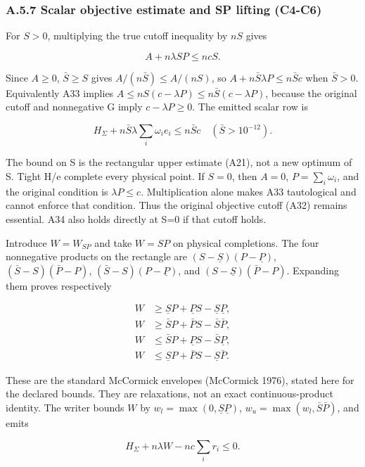\documentclass[
  american,
  11pt,
]{article}
\begin{document}
\subsubsection{A.5.7 Scalar objective estimate and SP lifting
(C4-C6)}\label{a.5.7-scalar-objective-estimate-and-sp-lifting-c4-c6}

For \(S>0\), multiplying the true cutoff inequality by \(nS\) gives

\[
A+n\lambda SP\le ncS.
\tag{A33}
\]

Since \(A\ge0\), \(\bar S\ge S\) gives \(A/(n\bar S)\le A/(nS)\), so
\(A+n\bar S\lambda P\le n\bar Sc\) when \(\bar S>0\). Equivalently A33
implies \(A\le nS(c-\lambda P)\le n\bar S(c-\lambda P)\), because the
original cutoff and nonnegative G imply \(c-\lambda P\ge0\). The emitted
scalar row is

\[
H_\Sigma+n\bar S\lambda\sum_i\omega_i e_i\le n\bar S c\quad(\bar S>10^{-12}).
\tag{A34}
\]

The bound on S is the rectangular upper estimate (A21), not a new
optimum of S. Tight H/e complete every physical point. If \(S=0\), then
\(A=0\), \(P=\sum_i\omega_i\), and the original condition is
\(\lambda P\le c\). Multiplication alone makes A33 tautological and
cannot enforce that condition. Thus the original objective cutoff (A32)
remains essential. A34 also holds directly at S=0 if that cutoff holds.

Introduce \(W=W_{SP}\) and take \(W=SP\) on physical completions. The
four nonnegative products on the rectangle are
\((S-\underline S)(P-\underline P)\), \((\bar S-S)(\bar P-P)\),
\((\bar S-S)(P-\underline P)\), and \((S-\underline S)(\bar P-P)\).
Expanding them proves respectively

\[
\begin{aligned}
W&\ge\underline S P+\underline P S-\underline S\underline P,\\
W&\ge\bar S P+\bar P S-\bar S\bar P,\\
W&\le\bar S P+\underline P S-\bar S\underline P,\\
W&\le\underline S P+\bar P S-\underline S\bar P.
\end{aligned}\tag{A17}
\]

These are the standard McCormick envelopes (McCormick 1976), stated here
for the declared bounds. They are relaxations, not an exact
continuous-product identity. The writer bounds \(W\) by
\(w_l=\max(0,\underline S\underline P)\),
\(w_u=\max(w_l,\bar S\bar P)\), and emits

\[
H_\Sigma+n\lambda W-nc\sum_i r_i\le0.
\tag{A35}
\]
\end{document}

